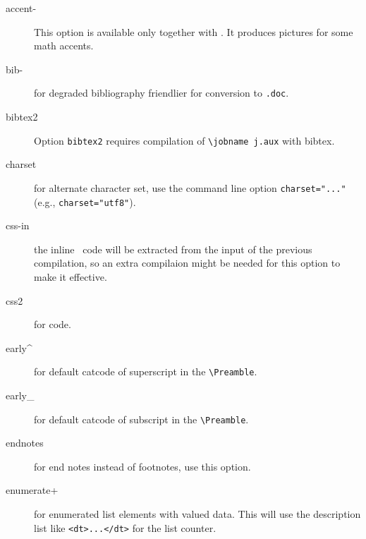 \begin{description}
\item[accent-] This option is available only together with
  . It produces pictures for some math accents.


\item[bib-] for degraded bibliography friendlier for conversion to
  \verb=.doc=.

\item[bibtex2] Option \verb=bibtex2= requires compilation of
  \verb=\jobname j.aux= with bibtex.


\item[charset] for alternate character set, use the command line
  option \verb+charset="..."+ (e.g., \verb+charset="utf8"+).


\item[css-in] the inline \css\ code will be extracted from the input of
  the previous compilation, so an extra compilaion might be needed for
  this option to make it effective.

\item[css2] for  code.


\item[early\textasciicircum] for default catcode of superscript in the
  \verb=\Preamble=.

\item[early\_] for default catcode of subscript in the
  \verb=\Preamble=.


\item[endnotes] for end notes instead of footnotes, use this option.


\item[enumerate+] for enumerated list elements with valued data. This
  will use the description list like \verb=<dt>...</dt>= for the list
  counter.


\end{description}
